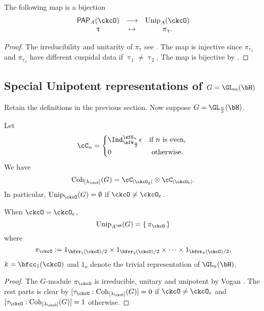 \documentclass[counting_main.tex]{subfiles}
\begin{document}
\begin{thm}[c.f. Vogan]
  The following map is a bijection
  \[
    \begin{array}{ccc}
      \PP_{A}(\ckcO) & \longrightarrow & \Unip_{A}(\ckcO)\\
      \uptau & \mapsto & \pi_{\uptau}.
    \end{array}
  \]
\end{thm}
\begin{proof}
  The irreducibility and unitarity of $\pi_{\uptau}$ see \cite{V.GL}.
  The map is injective since $\pi_{\uptau_{1}}$ and $\pi_{\uptau_{2}}$ have different
  cuspidal data if  $\uptau_{1}\neq \uptau_{2}$.
  The map is bijective by .
\end{proof}

\subsection{Special Unipotent representations of $G=\GL_{m}(\bH)$}

Retain the definitions in the previous section. Now suppose $G = \GL_{\frac{n}{2}}(\bH)$.

\begin{lem}
  Let
  \[
  \cC_{n} = \begin{cases}
    \Ind_{\sfW_{\frac{n}{2}}}^{\sfS_{n}}\epsilon
    & \text{if $n$ is even, }  \\
      0 & \text{ otherwise. } \\
    \end{cases}
  \]
  We have
  \[
    \Cint{\lamck}(G)  =
    \cC_{\abs{\ckcO_{g}}}\otimes \cC_{\abs{\ckcO_{b}}}.
  \]
  In particular, $\Unip_\ckcO(G) = \emptyset$ if $\ckcO \neq \ckcO_e$.

  When $\ckcO = \ckcO_{e}$,
  \[
    \Unip_{A^{\bH}}(G) = \set{\pi_{\ckcO}}
  \]
  where
  \[
    \pi_{\ckcO} := 1_{\bfrr_1(\ckcO)/2}\times 1_{\bfrr_2(\ckcO)/2} \times \cdots
   \times  1_{\bfrr_k(\ckcO)/2},
  \]
  $k = \bfcc_{1}(\ckcO)$
  and $1_{a}$ denote the trivial representation of $\GL_{a}(\bH)$.

\end{lem}
\begin{proof}
  The $G$-module $\pi_{\ckcO}$ is irreducible, unitary and unipotent by Vogan
  \cite{V.GL}.
  The rest parts is clear by $[\tau_{\ckcO}:\Cint{\lamck}(G)] = 0$ if
  $\ckcO \neq \ckcO_{e}$
  and $[\tau_{\ckcO}:\Cint{\lamck}(G)] = 1$ otherwise.
\end{proof}
\end{document}
